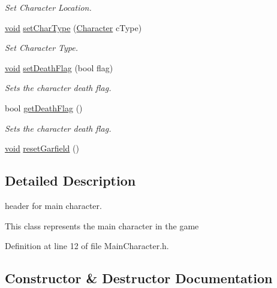 \begin{DoxyCompactItemize}
\begin{DoxyCompactList}\small\item\em Set Character Location. \end{DoxyCompactList}\item 
\mbox{\hyperlink{_s_d_l__opengles2__gl2ext_8h_ae5d8fa23ad07c48bb609509eae494c95}{void}} \mbox{\hyperlink{class_main_character_a992298eddcf6b2da1c3286872fa8f89e}{set\+Char\+Type}} (\mbox{\hyperlink{_constants_8h_aba9a62a0230bce162e345c6b6e793273}{Character}} c\+Type)
\begin{DoxyCompactList}\small\item\em Set Character Type. \end{DoxyCompactList}\item 
\mbox{\hyperlink{_s_d_l__opengles2__gl2ext_8h_ae5d8fa23ad07c48bb609509eae494c95}{void}} \mbox{\hyperlink{class_main_character_afa84b9884b31ac21c0da334db8a3d611}{set\+Death\+Flag}} (bool flag)
\begin{DoxyCompactList}\small\item\em Sets the character death flag. \end{DoxyCompactList}\item 
bool \mbox{\hyperlink{class_main_character_a7bfa07e6e592fbc04a0f346f9b327c34}{get\+Death\+Flag}} ()
\begin{DoxyCompactList}\small\item\em Sets the character death flag. \end{DoxyCompactList}\item 
\mbox{\hyperlink{_s_d_l__opengles2__gl2ext_8h_ae5d8fa23ad07c48bb609509eae494c95}{void}} \mbox{\hyperlink{class_main_character_a137f161069695697dc2e7359b65d1c06}{reset\+Garfield}} ()
\end{DoxyCompactItemize}


\subsection{Detailed Description}
header for main character. 

This class represents the main character in the game 

Definition at line 12 of file Main\+Character.\+h.



\subsection{Constructor \& Destructor Documentation}
\mbox{\label{class_main_character_a822c6796f6cac04dedfaa12846f1dd42}} 
